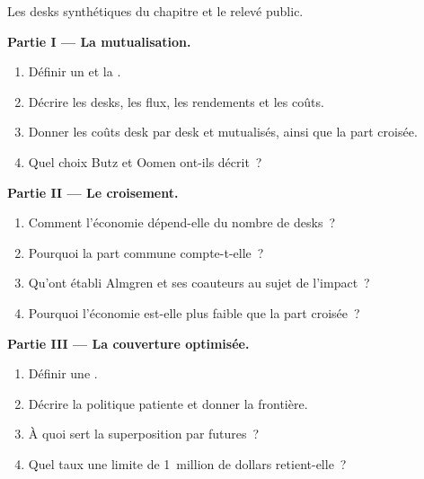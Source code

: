 \begin{problem}\label{pb:s2:the-central-risk-book:1}
Les desks synthétiques du chapitre et le relevé public.

\medskip\noindent\textbf{Partie I --- La mutualisation.}
\begin{enumerate}
\item Définir un  et la .
\item Décrire les desks, les flux, les rendements et les coûts.
\item Donner les coûts desk par desk et mutualisés, ainsi que la part croisée.
\item Quel choix Butz et Oomen ont-ils décrit~?
\end{enumerate}

\medskip\noindent\textbf{Partie II --- Le croisement.}
\begin{enumerate}[resume]
\item Comment l'économie dépend-elle du nombre de desks~?
\item Pourquoi la part commune compte-t-elle~?
\item Qu'ont établi Almgren et ses coauteurs au sujet de l'impact~?
\item Pourquoi l'économie est-elle plus faible que la part croisée~?
\end{enumerate}

\medskip\noindent\textbf{Partie III --- La couverture optimisée.}
\begin{enumerate}[resume]
\item Définir une .
\item Décrire la politique patiente et donner la frontière.
\item À quoi sert la superposition par futures~?
\item Quel taux une limite de 1~million de dollars retient-elle~?
\end{enumerate}


\end{problem}

